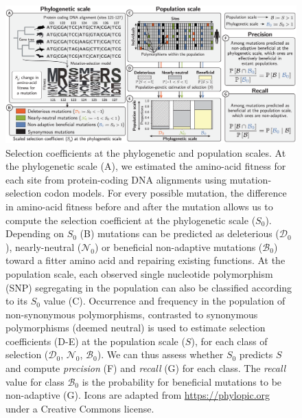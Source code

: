\documentclass{article}
\newcommand{\Sphy}{S_{0}}
\newcommand{\SphyDel}{\mathcal{D}_0}
\newcommand{\SphyNeu}{\mathcal{N}_0}
\newcommand{\SphyBen}{\mathcal{B}_0}
\newcommand{\Spop}{S}
\begin{document}
    \begin{figure}[!h]
        \centering
        \includegraphics[width=\textwidth, page=1] {figure2.eps}
        \caption{
            Selection coefficients at the phylogenetic and population scales.
            At the phylogenetic scale (A), we estimated the amino-acid fitness for each site from protein-coding DNA alignments using mutation-selection codon models.
            For every possible mutation, the difference in amino-acid fitness before and after the mutation allows us to compute the selection coefficient at the phylogenetic scale ($\Sphy$).
            Depending on $\Sphy$ (B) mutations can be predicted as deleterious ($\SphyDel$), nearly-neutral ($\SphyNeu$) or beneficial non-adaptive mutations ($\SphyBen$) toward a fitter amino acid and repairing existing functions.
            At the population scale, each observed single nucleotide polymorphism (SNP) segregating in the population can also be classified according to its $\Sphy$ value (C).
            Occurrence and frequency in the population of non-synonymous polymorphisms, contrasted to synonymous polymorphisms (deemed neutral) is used to estimate selection coefficients (D-E) at the population scale ($\Spop$), for each class of selection ($\SphyDel$, $\SphyNeu$, $\SphyBen$).
            We can thus assess whether $\Sphy$ predicts $\Spop$ and compute \textit{precision} (F) and \textit{recall} (G) for each class.
            The \textit{recall} value for class $\SphyBen$ is the probability for beneficial mutations to be non-adaptive (G).
            Icons are adapted from \href{https://phylopic.org}{https://phylopic.org} under a Creative Commons license.
        }
        \label{fig:method}
    \end{figure}
\end{document}
